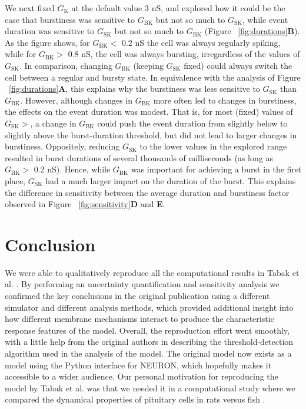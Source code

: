 \documentclass[10pt,a4paper,onecolumn]{article}
\begin{document}
We next fixed \(G_{\mathrm{K}}\) at the default value 3 nS, and explored
how it could be the case that burstiness was sensitive to
\(G_{\mathrm{BK}}\) but not so much to \(G_{\mathrm{SK}}\), while event
duration was sensitive to \(G_{\mathrm{SK}}\) but not so much to
\(G_{\mathrm{BK}}\) (Figure ~\ref{fig:durations}\textbf{B}). As the
figure shows, for \(G_{\mathrm{BK}}<\) 0.2 nS the cell was always
regularly spiking, while for \(G_{\mathrm{BK}}>\) 0.8 nS, the cell was
always bursting, irregardless of the values of \(G_{\mathrm{SK}}\). In
comparison, changing \(G_\mathrm{BK}\) (keeping \(G_{\mathrm{SK}}\)
fixed) could always switch the cell between a regular and bursty state.
In equivalence with the analysis of Figure
~\ref{fig:durations}\textbf{A}, this explains why the burstiness was
less sensitive to \(G_{\mathrm{SK}}\) than \(G_{\mathrm{BK}}\). However,
although changes in \(G_{\mathrm{BK}}\) more often led to changes in
burstiness, the effects on the event duration was modest. That is, for
most (fixed) values of \(G_{\mathrm{SK}}>\), a change in
\(G_{\mathrm{BK}}\) could push the event duration from slightly below to
slightly above the burst-duration threshold, but did not lead to larger
changes in burstiness. Oppositely, reducing \(G_\mathrm{SK}\) to the
lower values in the explored range resulted in burst durations of
several thousands of milliseconds (as long as \(G_{\mathrm{BK}}>\) 0.2
nS). Hence, while \(G_{\mathrm{BK}}\) was important for achieving a
burst in the first place, \(G_{\mathrm{SK}}\) had a much larger impact
on the duration of the burst. This explains the difference in
sensitivity between the average duration and burstiness factor observed
in Figure ~\ref{fig:sensitivity}\textbf{D} and \textbf{E}.

\section{Conclusion}\label{conclusion}

We were able to qualitatively reproduce all the computational results in
Tabak et al. \autocite{tabak2011}. By performing an uncertainty
quantification and sensitivity analysis we confirmed the key conclusions
in the original publication using a different simulator and different
analysis methods, which provided additional insight into how different
membrane mechanisms interact to produce the characteristic response
features of the model. Overall, the reproduction effort went smoothly,
with a little help from the original authors in describing the
threshold-detection algorithm used in the analysis of the model. The
original model now exists as a model using the Python interface for
NEURON, which hopefully makes it accessible to a wider audience. Our
personal motivation for reproducing the model by Tabak et al. was that
we needed it in a computational study where we compared the dynamical
properties of pituitary cells in rats versus fish \autocite{halnes2018}.

{\sffamily \small
  \printbibliography[title=References]
}
\end{document}
